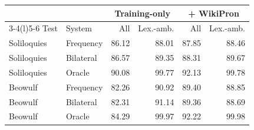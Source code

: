\begin{tabular}{@{}llrrrr@{}}
\toprule
 & & \multicolumn{2}{c}{Training-only} & \multicolumn{2}{c}{+ WikiPron} \\
\cmidrule(lr){3-4}\cmidrule(l){5-6}
Test & System & All & Lex.-amb. & All & Lex.-amb. \\
\midrule
Soliloquies & Frequency & 86.12 & 88.01 & 87.85 & 88.46 \\
Soliloquies & Bilateral & 86.57 & 89.35 & 88.31 & 89.67 \\
Soliloquies & Oracle & 90.08 & 99.77 & 92.13 & 99.78 \\
\addlinespace
Beowulf & Frequency & 82.26 & 90.92 & 89.40 & 88.85 \\
Beowulf & Bilateral & 82.31 & 91.14 & 89.36 & 88.69 \\
Beowulf & Oracle & 84.29 & 99.97 & 92.22 & 99.98 \\

\bottomrule
\end{tabular}
